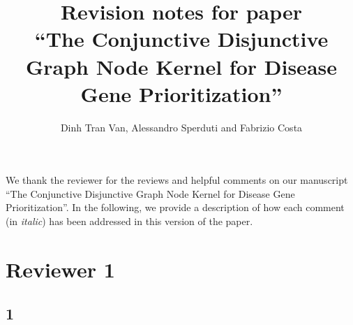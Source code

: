 \documentclass[11pt]{article}
\title{Revision notes for paper\\``The Conjunctive Disjunctive Graph Node Kernel for Disease Gene Prioritization''}
\author{Dinh Tran Van, Alessandro Sperduti and Fabrizio Costa }
\begin{document}
\maketitle

We thank the reviewer for the reviews and helpful comments on our manuscript ``The Conjunctive Disjunctive Graph Node Kernel for
Disease Gene Prioritization''. In the following, we provide a description of how each comment (in \emph{italic}) has been addressed in this version of the paper.

\section{Reviewer 1}
\subsection*{1}
\end{document}
